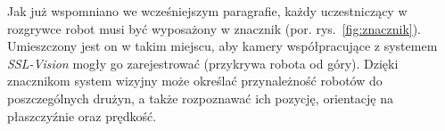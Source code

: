 	Jak już wspomniano we wcześniejszym paragrafie, każdy uczestniczący w rozgrywce robot musi być wyposażony w znacznik (por. rys.~\ref{fig:znacznik}).
	Umieszczony jest on w takim miejscu, aby kamery współpracujące z systemem \mbox{\emph{SSL-Vision}} mogły go zarejestrować (przykrywa robota od góry).
	Dzięki znacznikom system wizyjny może określać przynależność robotów do poszczególnych drużyn, a także rozpoznawać ich pozycję, orientację na płaszczyźnie oraz prędkość.